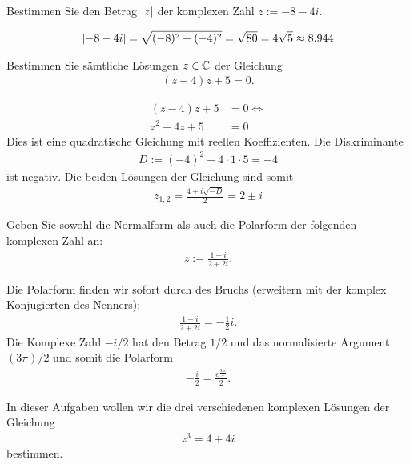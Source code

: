 \begin{questions}
\question[1]
Bestimmen Sie den Betrag $\left\lvert z\right\rvert$ der komplexen Zahl $z := -8 - 4i$.
\begin{solution}
\begin{align*}
    \left\lvert-8-4i\right\rvert = \sqrt{(-8)^2+(-4)^2} = \sqrt{80} = 4\sqrt{5} \approx 8.944
\end{align*}
\end{solution}


\question[1] Bestimmen Sie sämtliche Lösungen $z\in\mathbb{C}$ der Gleichung
\begin{align*}
    (z - 4)z + 5 = 0.
\end{align*}
\begin{solution}
\begin{align*}
    (z - 4)z + 5 &= 0 \iff \\
    z^2 - 4z + 5 &= 0
\end{align*}
Dies ist eine quadratische Gleichung mit reellen Koeffizienten. Die Diskriminante
\begin{align*}
    D := (-4)^2 - 4\cdot 1\cdot 5 = -4
\end{align*}
ist negativ. Die beiden Lösungen der Gleichung sind somit
\begin{align*}
    z_{1,2} = \frac{4\pm i\sqrt{-D}}{2} = 2 \pm i
\end{align*}
\end{solution}

\question[1] Geben Sie sowohl die Normalform als auch die Polarform der folgenden komplexen Zahl an:
\begin{align*}
    z := \frac{1-i}{2+2i}.
\end{align*}
\begin{solution}
Die Polarform finden wir sofort durch  des Bruchs (erweitern mit der komplex Konjugierten des Nenners):
\begin{align*}
    \frac{1-i}{2+2i} = -\frac{1}{2}i.
\end{align*}
Die Komplexe Zahl $-i/2$ hat den Betrag $1/2$ und das normalisierte Argument $(3\pi)/2$ und somit die Polarform
\begin{align*}
    -\frac{i}{2} = \frac{e^{\frac{3\pi i}{2}}}{2}.
\end{align*}
\end{solution}

\question
In dieser Aufgaben wollen wir die drei verschiedenen komplexen Lösungen der Gleichung
\begin{align}\label{eq:komplex}
    z^3 = 4+4i
\end{align}
bestimmen.
\begin{parts}

\end{parts}
\end{questions}
